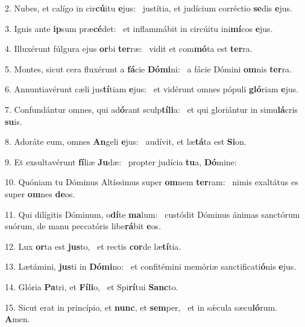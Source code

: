 2. Nubes, et calígo in cir\textbf{cú}itu \textbf{e}jus: \ast\  justítia, et judícium corréctio \textbf{se}dis \textbf{e}jus.\

3. Ignis ante \textbf{ip}sum præ\textbf{cé}det: \ast\  et inflammábit in circúitu ini\textbf{mí}cos \textbf{e}jus.\

4. Illuxérunt fúlgura ejus \textbf{or}bi \textbf{ter}ræ: \ast\  vidit et com\textbf{mó}ta est \textbf{ter}ra.\

5. Montes, sicut cera fluxérunt a \textbf{fá}cie \textbf{Dó}\textbf{mi}ni: \ast\  a fácie Dómini \textbf{om}nis \textbf{ter}ra.\

6. Annuntiavérunt cæli jus\textbf{tí}tiam \textbf{e}jus: \ast\  et vidérunt omnes pópuli \textbf{gló}riam \textbf{e}jus.\

7. Confundántur omnes, qui ad\textbf{ó}rant sculp\textbf{tí}\textbf{li}a: \ast\  et qui gloriántur in simu\textbf{lá}cris \textbf{su}is.\

8. Adoráte eum, omnes \textbf{An}geli \textbf{e}jus: \ast\  audívit, et læ\textbf{tá}ta est \textbf{Si}on.\

9. Et exsultavérunt \textbf{fí}liæ \textbf{Ju}dæ: \ast\  propter judícia \textbf{tu}a, \textbf{Dó}mine:\

10. Quóniam tu Dóminus Altíssimus super \textbf{om}nem \textbf{ter}ram: \ast\  nimis exaltátus es super \textbf{om}nes \textbf{de}os.\

11. Qui dilígitis Dóminum, o\textbf{dí}te \textbf{ma}lum: \ast\  custódit Dóminus ánimas sanctórum suórum, de manu peccatóris libe\textbf{rá}bit \textbf{e}os.\

12. Lux \textbf{or}ta est \textbf{jus}to, \ast\  et rectis \textbf{cor}de læ\textbf{tí}tia.\

13. Lætámini, \textbf{jus}ti in \textbf{Dó}\textbf{mi}no: \ast\  et confitémini memóriæ sanctificati\textbf{ó}nis \textbf{e}jus.\

14. Glória \textbf{Pa}tri, et \textbf{Fí}\textbf{li}o, \ast\  et Spi\textbf{rí}tui \textbf{Sanc}to.\

15. Sicut erat in princípio, et \textbf{nunc}, et \textbf{sem}per, \ast\  et in sǽcula sæcu\textbf{ló}rum. \textbf{A}men.\

